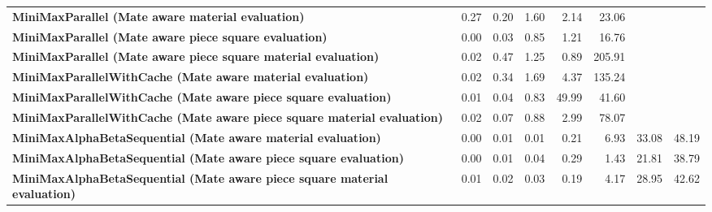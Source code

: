 \begin{table}[H]
{\begin{tabular}{|p{8cm}|*{7}{r|}}
            \rowcolor[HTML]{FFFFFF}
            \textbf{MiniMaxParallel (Mate aware material evaluation)}                                  & 0.27                                  & 0.20                                  & 1.60                                  & 2.14                                  & 23.06 &  &  \\
            \rowcolor[HTML]{EFEFEF}
            \textbf{MiniMaxParallel (Mate aware piece square evaluation)}                              & 0.00                                  & 0.03                                  & 0.85                                  & 1.21 & 16.76 &  &  \\
            \rowcolor[HTML]{FFFFFF}
            \textbf{MiniMaxParallel (Mate aware piece square material evaluation)}                     & 0.02                                  & 0.47 & 1.25 & 0.89 & 205.91 &  &  \\

            \rowcolor[HTML]{EFEFEF}
            \textbf{MiniMaxParallelWithCache (Mate aware material evaluation)}                         & 0.02                                  & 0.34                                  & 1.69 & 4.37 & 135.24 &  &  \\
            \rowcolor[HTML]{FFFFFF}
            \textbf{MiniMaxParallelWithCache (Mate aware piece square evaluation)}                     & 0.01                                  & 0.04 & 0.83 & 49.99 & 41.60 &  &  \\
            \rowcolor[HTML]{EFEFEF}
            \textbf{MiniMaxParallelWithCache (Mate aware piece square material evaluation)}            & 0.02 & 0.07 & 0.88 & 2.99 & 78.07 &  &  \\

            \rowcolor[HTML]{FFFFFF}
            \textbf{MiniMaxAlphaBetaSequential (Mate aware material evaluation)}                       & 0.00                                  & 0.01                                  & 0.01 & 0.21 & 6.93 & 33.08 & 48.19 \\
            \rowcolor[HTML]{EFEFEF}
            \textbf{MiniMaxAlphaBetaSequential (Mate aware piece square evaluation)}                   & 0.00                                  & 0.01 & 0.04 & 0.29 & 1.43 & 21.81 & 38.79 \\
            \rowcolor[HTML]{FFFFFF}
            \textbf{MiniMaxAlphaBetaSequential (Mate aware piece square material evaluation)}               & 0.01 & 0.02 & 0.03 & 0.19 & 4.17 & 28.95 & 42.62 \\


\end{tabular}}
\end{table}
